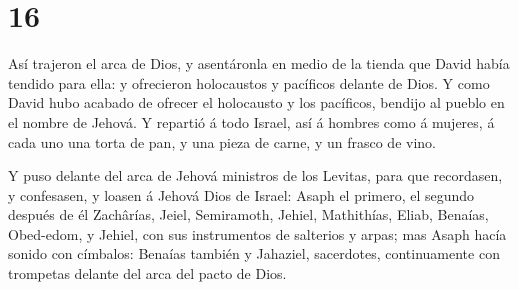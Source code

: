 \hypertarget{section-15}{%
\section{16}\label{section-15}}

 Así trajeron el arca de Dios, y asentáronla en medio de la
tienda que David había tendido para ella: y ofrecieron holocaustos y
pacíficos delante de Dios.  Y como David hubo acabado de
ofrecer el holocausto y los pacíficos, bendijo al pueblo en el nombre de
Jehová.  Y repartió á todo Israel, así á hombres como á
mujeres, á cada uno una torta de pan, y una pieza de carne, y un frasco
de vino.

 Y puso delante del arca de Jehová ministros de los Levitas,
para que recordasen, y confesasen, y loasen á Jehová Dios de Israel:
 Asaph el primero, el segundo después de él Zachârías,
Jeiel, Semiramoth, Jehiel, Mathithías, Eliab, Benaías, Obed-edom, y
Jehiel, con sus instrumentos de salterios y arpas; mas Asaph hacía
sonido con címbalos:  Benaías también y Jahaziel,
sacerdotes, continuamente con trompetas delante del arca del pacto de
Dios.

